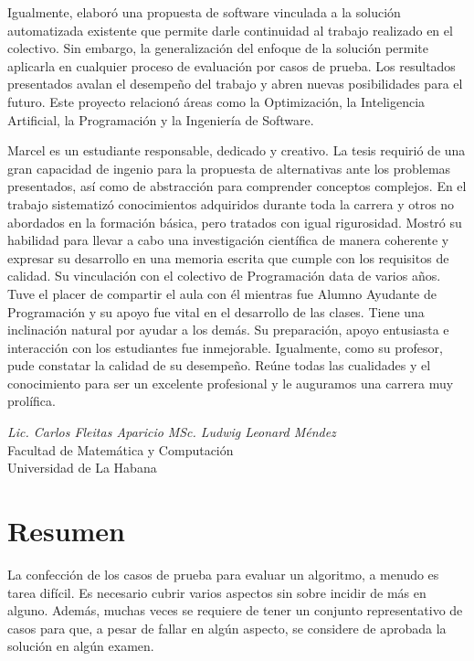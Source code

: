 \documentclass[a4paper,openright,11pt,oneside]{book}
\begin{document}
	
	Igualmente, elaboró una propuesta de software vinculada a la solución automatizada existente que permite darle continuidad al trabajo realizado en el colectivo. Sin embargo, la generalización del enfoque de la solución permite aplicarla en cualquier proceso de evaluación por casos de prueba. Los resultados presentados avalan el desempeño del trabajo y abren nuevas posibilidades para el futuro. Este proyecto relacionó áreas como la Optimización, la Inteligencia Artificial, la Programación y la Ingeniería de Software.
	
	
	Marcel es un estudiante responsable, dedicado y creativo. La tesis requirió de una gran capacidad de ingenio para la propuesta de alternativas ante los problemas presentados, así como de abstracción para comprender conceptos complejos. En el trabajo sistematizó conocimientos adquiridos durante toda la carrera y otros no abordados en la formación básica, pero tratados con igual rigurosidad. Mostró su habilidad para llevar a cabo una investigación científica de manera coherente y expresar su desarrollo en una memoria escrita que cumple con los requisitos de calidad. Su vinculación con el colectivo de Programación data de varios años. Tuve el placer de compartir el aula con él mientras fue Alumno Ayudante de Programación y su apoyo fue vital en el desarrollo de las clases. Tiene una inclinación natural por ayudar a los demás. Su preparación, apoyo entusiasta e interacción con los estudiantes fue inmejorable. Igualmente, como su profesor, pude constatar la calidad de su desempeño. Reúne todas las cualidades y el conocimiento para ser un excelente profesional y le auguramos una carrera muy prolífica.
	
	\vspace{1cm}
	
	\begin{center}
		\emph{Lic. Carlos Fleitas Aparicio} \hspace{15pt} \emph{MSc. Ludwig Leonard Méndez} \\
		Facultad de Matemática y Computación \\
		Universidad de La Habana    
	\end{center}

\tableofcontents
	

\chapter*{Resumen}
	La confección de los casos de prueba para evaluar un algoritmo, a menudo es tarea difícil. Es necesario cubrir varios aspectos sin sobre incidir de más en alguno. Además, muchas veces se requiere de tener un conjunto representativo de casos  para que, a pesar de fallar en algún aspecto, se considere de aprobada la solución en algún examen.
	
\end{document}
